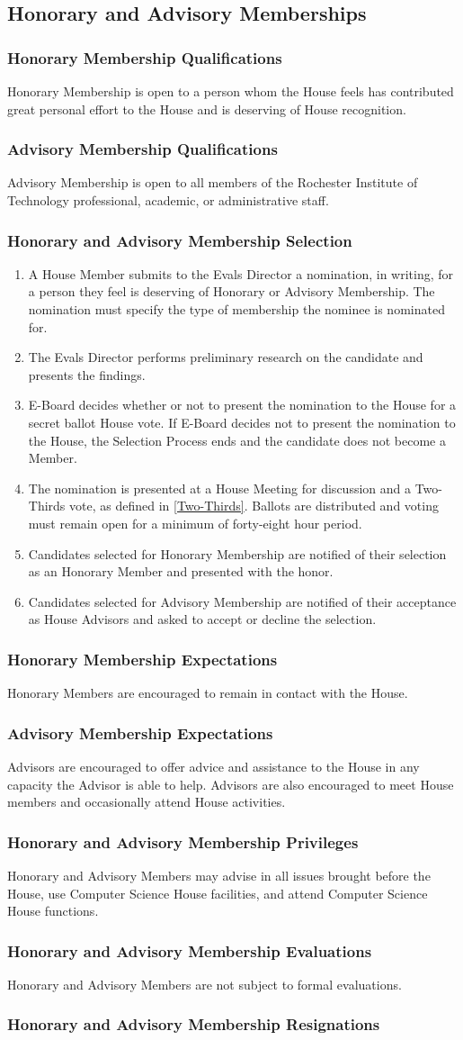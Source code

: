 \documentclass{article}
\newcommand{\asection}[1]{\subsection{#1} \label{#1}}
\newcommand{\asubsection}[1]{\subsubsection{#1} \label{#1}}
\begin{document}
\asection{Honorary and Advisory Memberships}
\asubsection{Honorary Membership Qualifications}
Honorary Membership is open to a person whom the House feels has contributed great personal effort to the House and is deserving of House recognition.
\asubsection{Advisory Membership Qualifications}
Advisory Membership is open to all members of the Rochester Institute of Technology professional, academic, or administrative staff.
\asubsection{Honorary and Advisory Membership Selection}
\begin{enumerate}
	\item A House Member submits to the Evals Director a nomination, in writing, for a person they feel is deserving of Honorary or Advisory Membership. The nomination must specify the type of membership the nominee is nominated for.
	\item The Evals Director performs preliminary research on the candidate and presents the findings.
	\item E-Board decides whether or not to present the nomination to the House for a secret ballot House vote.
		If E-Board decides not to present the nomination to the House, the Selection Process ends and the candidate does not become a Member.

	\item The nomination is presented at a House Meeting for discussion and a Two-Thirds vote, as defined in \ref{Two-Thirds}.
		Ballots are distributed and voting must remain open for a minimum of forty-eight hour period.
	\item Candidates selected for Honorary Membership are notified of their selection as an Honorary Member and presented with the honor.
    \item Candidates selected for Advisory Membership are notified of their acceptance as House Advisors and asked to accept or decline
        the selection.
\end{enumerate}
\asubsection{Honorary Membership Expectations}
Honorary Members are encouraged to remain in contact with the House.
\asubsection{Advisory Membership Expectations}
Advisors are encouraged to offer advice and assistance to the House in any capacity the Advisor is able to help.
Advisors are also encouraged to meet House members and occasionally attend House activities.
\asubsection{Honorary and Advisory Membership Privileges}
Honorary and Advisory Members may advise in all issues brought before the House, use Computer Science House facilities, and attend Computer Science House functions.
\asubsection{Honorary and Advisory Membership Evaluations}
Honorary and Advisory Members are not subject to formal evaluations.
\asubsection{Honorary and Advisory Membership Resignations}
\end{document}
